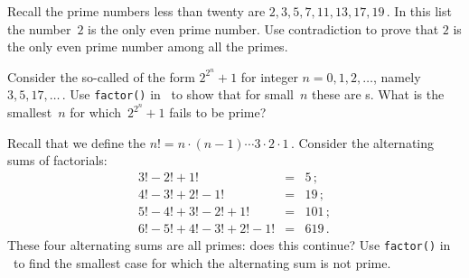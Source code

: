 \begin{draft}
\begin{exercise} \label{ex:} 
Recall the prime numbers less than twenty are \(2,3,5,7,11,13,17,19\)\,.
In this list the number~\(2\) is the only even prime number.
Use contradiction to prove that \(2\) is the only even prime number among all the primes.
\end{exercise}



\begin{exercise} \label{ex:} 
Consider the so-called  of the form \(2^{2^n}+1\) for integer \(n=0,1,2,\ldots\), namely \(3,5,17,\ldots\)\,.  
Use \verb|factor()| in \script\ to show that for small~\(n\) these are s.
What is the smallest~\(n\) for which~\(2^{2^n}+1\) fails to be prime?
\end{exercise}


\begin{exercise} \label{ex:} 
Recall that we define the  \(n!=n\cdot(n-1)\cdots3\cdot2\cdot1\)\,.
Consider the alternating sums of factorials:
\begin{eqnarray*}
3!-2!+1!&=&5\,;\\
4!-3!+2!-1!&=&19\,;\\
5!-4!+3!-2!+1!&=&101\,;\\
6!-5!+4!-3!+2!-1!&=&619\,.
\end{eqnarray*}
These four alternating sums are all primes: does this continue?
Use \verb|factor()| in \script\ to find the smallest case for which the alternating sum is not prime.
\end{exercise}



\end{draft}
